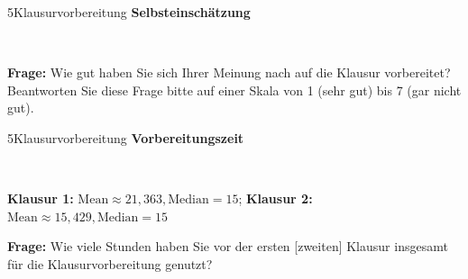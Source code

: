 \documentclass[xcolor=table,9pt,aspectratio=169]{beamer}
\begin{document}
\begin{frame}{\vspace*{10mm}5\hspace*{1em}Klausurvorbereitung}
\textbf{Selbsteinschätzung}\\

\smallskip
\begin{center}
   \\
\end{center}

\bigskip
\textbf{Frage:} Wie gut haben Sie sich Ihrer Meinung nach auf die Klausur vorbereitet? Beantworten Sie diese Frage bitte auf einer Skala von 1 (sehr gut) bis 7 (gar nicht gut).
\end{frame}


\begin{frame}{\vspace*{10mm}5\hspace*{1em}Klausurvorbereitung}
\textbf{Vorbereitungszeit}\\

\smallskip
\begin{center}
   \\
\end{center}
\textbf{Klausur 1:} $\text{Mean} \approx 21,363, \text{Median} = 15$; \textbf{Klausur 2:} $\text{Mean} \approx 15,429, \text{Median} = 15$

\bigskip
\textbf{Frage:} Wie viele Stunden haben Sie vor der ersten [zweiten] Klausur insgesamt für die Klausurvorbereitung genutzt?
\end{frame}
\end{document}
